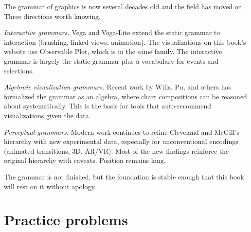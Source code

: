 \documentclass[
  letterpaper,
  11pt,
  twoside,
  openany]{scrbook}
\begin{document}
\begin{tcolorbox}[enhanced jigsaw, arc=.35mm, bottomrule=.15mm, bottomtitle=1mm, breakable, colback=white, colbacktitle=quarto-callout-important-color!10!white, colframe=quarto-callout-important-color-frame, coltitle=black, left=2mm, leftrule=.75mm, opacityback=0, opacitybacktitle=0.6, rightrule=.15mm, title=\textcolor{quarto-callout-important-color}{\faExclamation}\hspace{0.5em}{Frontier note}, titlerule=0mm, toprule=.15mm, toptitle=1mm]

The grammar of graphics is now several decades old and the field has
moved on. Three directions worth knowing.

\emph{Interactive grammars.} Vega and Vega-Lite extend the static
grammar to interaction (brushing, linked views, animation). The
visualizations on this book's website use Observable Plot, which is in
the same family. The interactive grammar is largely the static grammar
plus a vocabulary for events and selections.

\emph{Algebraic visualization grammars.} Recent work by Wills, Pu, and
others has formalized the grammar as an algebra, where chart
compositions can be reasoned about systematically. This is the basis for
tools that auto-recommend visualizations given the data.

\emph{Perceptual grammars.} Modern work continues to refine Cleveland
and McGill's hierarchy with new experimental data, especially for
unconventional encodings (animated transitions, 3D, AR/VR). Most of the
new findings reinforce the original hierarchy with caveats. Position
remains king.

The grammar is not finished, but the foundation is stable enough that
this book will rest on it without apology.

\end{tcolorbox}

\section{Practice problems}\label{practice-problems-3}
\end{document}

